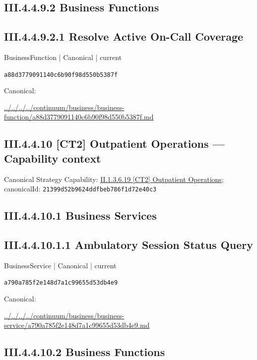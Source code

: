 \documentclass[10pt,a4paper]{article}
\begin{document}
\subsection*{III.4.4.9.2 Business Functions}
\subsection*{III.4.4.9.2.1 Resolve Active On-Call Coverage}
\label{element-a88d3779091140c6b90f98d550b5387f}
{\small BusinessFunction | Canonical | current}\par
\texttt{a88d3779091140c6b90f98d550b5387f}\par
Canonical: \par
{\footnotesize\url{../../../../continuum/business/business-function/a88d3779091140c6b90f98d550b5387f.md}}\par
\subsection*{III.4.4.10 [CT2] Outpatient Operations — Capability context}
Canonical Strategy Capability: \hyperref[element-21399d52b9624ddfbeb786f1d72e40c3]{II.1.3.6.19 [CT2] Outpatient Operations}; canonicalId: \texttt{21399d52b9624ddfbeb786f1d72e40c3}\par
\subsection*{III.4.4.10.1 Business Services}
\subsection*{III.4.4.10.1.1 Ambulatory Session Status Query}
\label{element-a790a785f2e148d7a1c99655d53db4e9}
{\small BusinessService | Canonical | current}\par
\texttt{a790a785f2e148d7a1c99655d53db4e9}\par
Canonical: \par
{\footnotesize\url{../../../../continuum/business/business-service/a790a785f2e148d7a1c99655d53db4e9.md}}\par
\subsection*{III.4.4.10.2 Business Functions}
\end{document}
